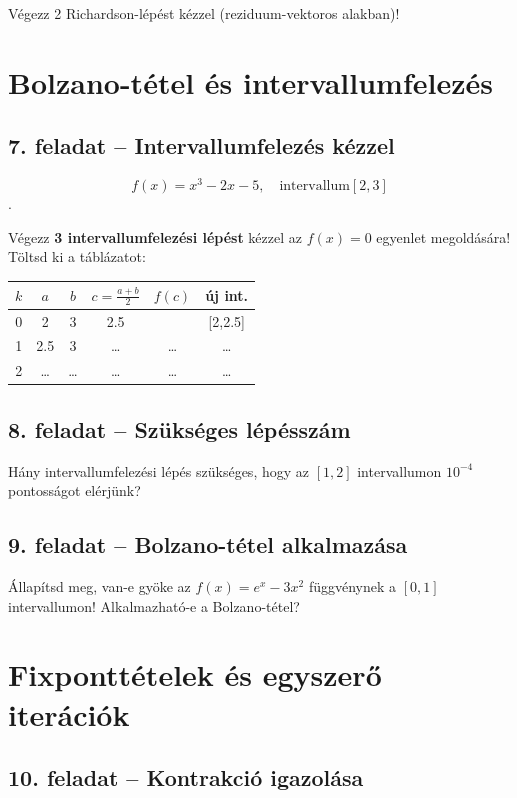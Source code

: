 \documentclass[a4paper,12pt]{article}
\begin{document}
Végezz 2 Richardson-lépést kézzel (reziduum-vektoros alakban)!


\section{Bolzano-tétel és intervallumfelezés}
\subsection*{7. feladat -- Intervallumfelezés kézzel}

$$f(x) = x^3 - 2x - 5, \quad \textrm{intervallum} [2, 3]$$.

Végezz \textbf{3 intervallumfelezési lépést} kézzel az $f(x) = 0$ egyenlet megoldására! Töltsd ki a táblázatot:

\begin{center}
\begin{tabular}{c|c|c|c|c|c}
\hline
$k$ & $a$ & $b$ & $c=\frac{a+b}{2}$ & $f(c)$ & új int.\\
\hline
0 & 2 & 3 & 2.5 &  & [2,2.5] \\
1 & 2.5 & 3 & \ldots & \ldots & \ldots\\
2 & \ldots & \ldots & \ldots & \ldots & \ldots\\
\hline
\end{tabular}
\end{center}


\subsection*{8. feladat -- Szükséges lépésszám}

Hány intervallumfelezési lépés szükséges, hogy az $[1, 2]$ intervallumon $10^{-4}$ pontosságot
elérjünk?


\subsection*{9. feladat -- Bolzano-tétel alkalmazása}

Állapítsd meg, van-e gyöke az $f(x) = e^x - 3x^2$ függvénynek a $[0,1]$ intervallumon!
Alkalmazható-e a Bolzano-tétel?


\section{Fixponttételek és egyszerő iterációk}
\subsection*{10. feladat -- Kontrakció igazolása}
\end{document}
